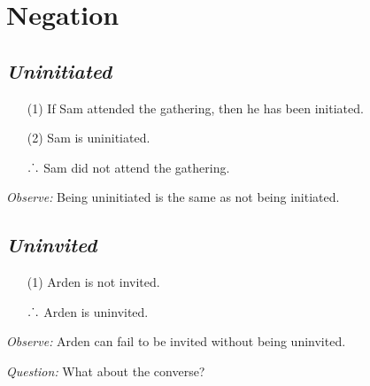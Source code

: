 \documentclass[a4paper, 11pt]{article} %
\def\therefore{\ensuremath{\ldotp\dot{}\,\ldotp}}
\begin{document}
\section*{Negation}

\subsection*{\it \textbf{Uninitiated}}

\begin{enumerate}
  \item[(1)] If Sam attended the gathering, then he has been initiated.
  \item[(2)] Sam is uninitiated.
  \item[\therefore] Sam did not attend the gathering.
\end{enumerate}

\noindent
\textit{Observe:} Being uninitiated is the same as not being initiated.





\subsection*{\it \textbf{Uninvited}}

\begin{enumerate}
  \item[(1)] Arden is not invited.
  \item[\therefore] Arden is uninvited.
\end{enumerate}

\noindent
\textit{Observe:} Arden can fail to be invited without being uninvited.
\vspace{.05in}

\noindent
\textit{Question:} What about the converse?
\end{document}
